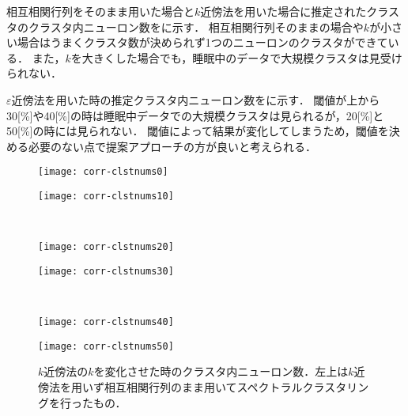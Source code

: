 相互相関行列をそのまま用いた場合と$k$近傍法を用いた場合に推定されたクラスタのクラスタ内ニューロン数をに示す．
相互相関行列そのままの場合や$k$が小さい場合はうまくクラスタ数が決められず1つのニューロンのクラスタができている．
また，$k$を大きくした場合でも，睡眠中のデータで大規模クラスタは見受けられない．

$\varepsilon$近傍法を用いた時の推定クラスタ内ニューロン数をに示す．
閾値が上から30[\%]や40[\%]の時は睡眠中データでの大規模クラスタは見られるが，20[\%]と50[\%]の時には見られない．
閾値によって結果が変化してしまうため，閾値を決める必要のない点で提案アプローチの方が良いと考えられる．

\begin{figure}[htbp]
    \begin{minipage}{0.49\hsize}
			\begin{center}
					\texttt{[image: corr-clstnums0]}
			\end{center}
		\end{minipage}
    \begin{minipage}{0.49\hsize}
			\begin{center}
					\texttt{[image: corr-clstnums10]}
			\end{center}
		\end{minipage}\\
    \begin{minipage}{0.49\hsize}
			\begin{center}
					\texttt{[image: corr-clstnums20]}
			\end{center}
		\end{minipage}
    \begin{minipage}{0.49\hsize}
			\begin{center}
					\texttt{[image: corr-clstnums30]}
			\end{center}
		\end{minipage}\\
    \begin{minipage}{0.49\hsize}
			\begin{center}
					\texttt{[image: corr-clstnums40]}
			\end{center}
		\end{minipage}
    \begin{minipage}{0.49\hsize}
			\begin{center}
					\texttt{[image: corr-clstnums50]}
			\end{center}
		\end{minipage}
		\label{fig:corr-clstnums}
		\caption{$k$近傍法の$k$を変化させた時のクラスタ内ニューロン数．左上は$k$近傍法を用いず相互相関行列のまま用いてスペクトラルクラスタリングを行ったもの．}
\end{figure}
